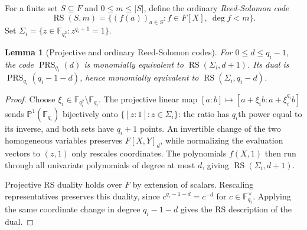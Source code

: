 \documentclass[11pt,letterpaper]{article}
\renewcommand{\le}{\leqslant}
\newtheorem{lemma}[theorem]{Lemma}
\theoremstyle{definition}
\theoremstyle{remark}
\newcommand{\F}{\mathbb F}
\newcommand{\PP}{\mathbb P}
\newcommand{\RS}{\operatorname{RS}}
\begin{document}
For a finite set $S\subseteq F$ and $0\le m\le|S|$, define the
ordinary \emph{Reed-Solomon code}
\[
 \RS(S,m)=\{(f(a))_{a\in S}:f\in F[X],\ \deg f<m\}.
\]
Set $\Sigma_i=\{z\in\F_{q_i^2}:z^{q_i+1}=1\}$.

\begin{lemma}[Projective and ordinary Reed-Solomon codes]
\label{lem:directional-evaluations}
For $0\le d\le q_i-1$, the code $\operatorname{PRS}_{q_i}(d)$ is
monomially equivalent to $\RS(\Sigma_i,d+1)$.
Its dual is $\operatorname{PRS}_{q_i}(q_i-1-d)$, hence monomially
equivalent to $\RS(\Sigma_i,q_i-d)$.
\end{lemma}
\begin{proof}
Choose $\xi_i\in\F_{q_i^2}\setminus\F_{q_i}$. The projective linear map
$[a:b]\mapsto[a+\xi_i b:a+\xi_i^{q_i}b]$ sends
$\PP^1(\F_{q_i})$ bijectively onto $\{[z:1]:z\in\Sigma_i\}$:
the ratio has $q_i$th power equal to its inverse, and both sets have
$q_i+1$ points. An invertible change of the two homogeneous variables
preserves $F[X,Y]_d$, while normalizing the evaluation vectors to
$(z,1)$ only rescales coordinates. The polynomials $f(X,1)$ then run
through all univariate polynomials of degree at most $d$, giving
$\RS(\Sigma_i,d+1)$.

Projective RS duality \cite[Corollary~4.11]{GimenezRuanoSanJose2023}
holds over $F$ by extension of scalars. Rescaling representatives preserves
this duality, since $c^{q_i-1-d}=c^{-d}$ for $c\in\F_{q_i}^\times$.
Applying the same coordinate change in degree $q_i-1-d$ gives
the RS description of the dual.
\end{proof}
\end{document}
